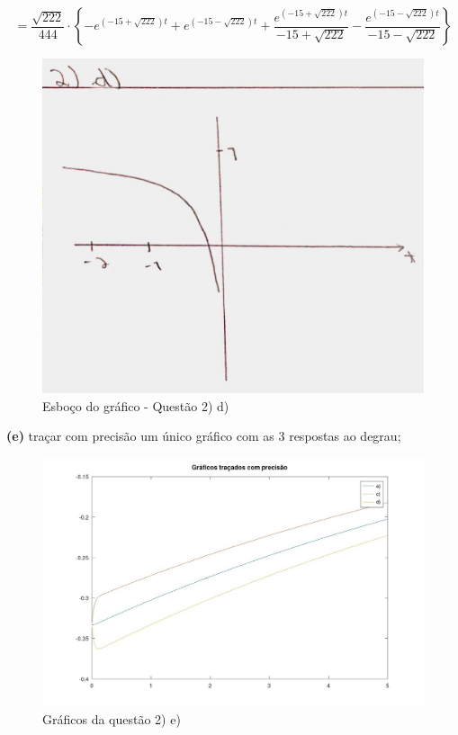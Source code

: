 \documentclass{article}
\begin{document}
\[ = \frac{\sqrt{222}}{444} \cdot \left\{ - e^{(-15+\sqrt{222})t} + e^{(-15-\sqrt{222})t} + \frac{e^{(-15+\sqrt{222})t}}{-15+\sqrt{222}} - \frac{e^{(-15-\sqrt{222})t}}{-15-\sqrt{222}} \right\} \]

\begin{figure}[h]
    \includegraphics[scale=0.25]{Q2_d.png}
    \centering
    \caption{Esboço do gráfico - Questão 2) d)}
\end{figure}

\textbf{(e)} traçar com precisão um único gráfico com as 3 respostas ao degrau;

\begin{figure}[h]
    \includegraphics[scale=0.25]{plot2e}
    \centering
    \caption{Gráficos da questão 2) e)}
\end{figure}
\end{document}

